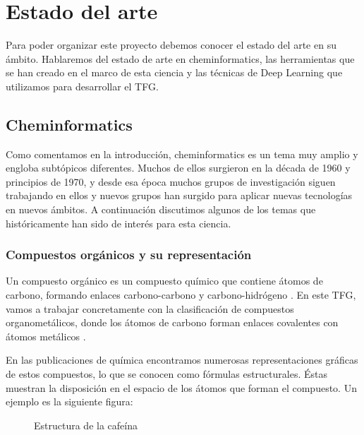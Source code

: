 \chapter{Estado del arte}
Para poder organizar este proyecto debemos conocer el estado del arte en su ámbito. Hablaremos del estado de arte en cheminformatics, las herramientas que se han creado en el marco de esta ciencia y las técnicas de Deep Learning que utilizamos para desarrollar el TFG.

\section{Cheminformatics}
Como comentamos en la introducción, cheminformatics es un tema muy amplio y engloba subtópicos diferentes. Muchos de ellos surgieron en la década de 1960 y principios de 1970, y desde esa época muchos grupos de investigación siguen trabajando en ellos y nuevos grupos han surgido para aplicar nuevas tecnologías en nuevos ámbitos. A continuación discutimos algunos de los temas que históricamente han sido de interés para esta ciencia. \cite{doi:10.1021/ci600234z}

\subsection{Compuestos orgánicos y su representación}
Un compuesto orgánico es un compuesto químico que contiene átomos de carbono, formando enlaces carbono-carbono y carbono-hidrógeno \cite{comporganico}. En este TFG, vamos a trabajar concretamente con la clasificación de compuestos organometálicos, donde los átomos de carbono forman enlaces covalentes con átomos metálicos \cite{comporganometalico}.

En las publicaciones de química encontramos numerosas representaciones gráficas de estos compuestos, lo que se conocen como fórmulas estructurales. Éstas muestran la disposición en el espacio de los átomos que forman el compuesto. Un ejemplo es la siguiente figura:

\begin{figure}[H]
\centering
    \caption{Estructura de la cafeína}
\end{figure}

